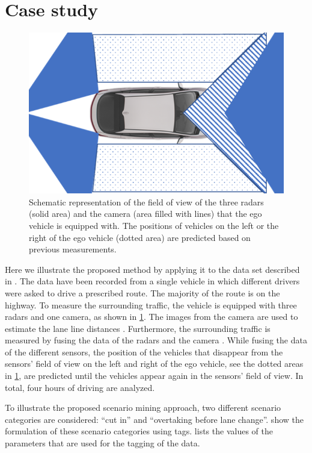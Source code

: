 \section{Case study}
\label{sec:case study}

\begin{figure}
	\centering
	\includegraphics[width=.8\linewidth]{figures/sensors}
	\caption{\cstartd Schematic representation of the field of view of the three radars (solid area) and the camera (area filled with lines) that the ego vehicle is equipped with. The positions of vehicles on the left or the right of the ego vehicle (dotted area) are predicted based on previous measurements. \cendd}
	\label{fig:sensors}
\end{figure}

Here we illustrate the proposed method by applying it to the data set described in \autocite{paardekooper2019dataset6000km}.
\cstartf The data have been recorded from a single vehicle in which different drivers were asked to drive a prescribed route.
The majority of the route is on the highway. \cendf
\cstartd To measure the surrounding traffic, the vehicle is equipped with three radars and one camera, as shown in \cref{fig:sensors}.
The images from the camera are used to estimate the lane line distances \autocite{elfring2016effective}.
Furthermore, the surrounding traffic is measured by fusing the data of the radars and the camera \autocite{elfring2016effective}.
While fusing the data of the different sensors, the position of the vehicles that disappear from the sensors' field of view on the left and right of the ego vehicle, see the dotted areas in \cref{fig:sensors}, are predicted until the vehicles appear again in the sensors' field of view.
In total, four hours of driving are analyzed.
\cendd

\cstartd To illustrate the proposed scenario mining approach, two different scenario categories are considered: ``cut in'' and ``overtaking before lane change''.
 show the formulation of these scenario categories using tags.
 lists the values of the parameters that are used for the tagging of the data.
\cendd

